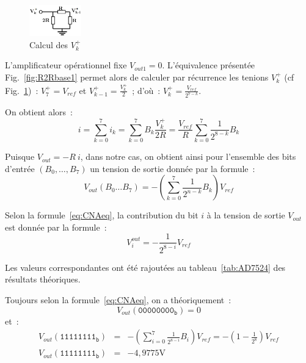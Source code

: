 \documentclass{article}
\begin{document}
\begin{figure}
  \begin{center}
    \includegraphics[width=0.2\textwidth]{AD7524eq}
  \end{center}
  \caption{Calcul des $V_k^+$}
  \label{fig:AD7524eq}
\end{figure}

L'amplificateur opérationnel fixe $V_{out1}=0$. L'équivalence présentée Fig.~\ref{fig:R2Rbase1} permet alors de calculer par récurrence les tenions $V_k^+$ (cf Fig.~\ref{fig:AD7524eq})~: $V_7^+ = V_{ref}$ et $V_{k-1}^+=\frac{V_k^+}{2}$~; d'où~: ${V_k^+=\frac{V_{ref}}{2^{7-k}}}$.

On obtient alors~:
\begin{equation*}
i = \sum_{k=0}^7 i_k = \sum_{k=0}^7 B_k \frac{V_k^+}{2R} = \frac{V_{ref}}{R} \sum_{k=0}^7 \frac{1}{2^{8-k}} B_k
\end{equation*}


Puisque $V_{out} = -R~i$, dans notre cas, on obtient ainsi pour l'ensemble des bits d'entrée $(B_0,\dots,B_7)$ un tension de sortie donnée par la formule~:
\begin{equation}
V_{out}(B_0\dots B_7) = -\left(\sum_{k=0}^{7}\frac{1}{2^{n-k}}B_k\right)V_{ref}
\label{eq:CNAeq}
\end{equation}


Selon la formule~\ref{eq:CNAeq}, la contribution du bit $i$ à la tension de sortie $V_{out}$ est donnée par la formule~:
\begin{equation*}
V_i^{out} = -\frac{1}{2^{8-i}}V_{ref}
\end{equation*}

Les valeurs correspondantes ont été rajoutées au tableau~\ref{tab:AD7524} des résultats théoriques.


Toujours selon la formule~\ref{eq:CNAeq}, on a théoriquement~:
\begin{equation*}
V_{out}(\mathtt{00000000_b}) = 0
\end{equation*}
et~:
\begin{eqnarray*}
V_{out}(\mathtt{11111111_b}) &=& -\left(\sum_{i=0}^{7}\frac{1}{2^{8-i}}B_i\right)V_{ref} = -(1-\frac{1}{2^8})V_{ref}\\
V_{out}(\mathtt{11111111_b}) &=& -4,9775\mathrm{V}
\end{eqnarray*}
\end{document}

